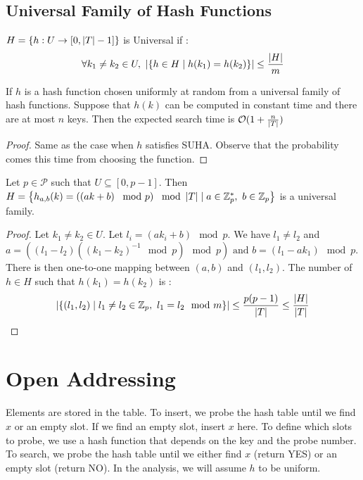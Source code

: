 \documentclass{cours}
\begin{document}
\subsection{Universal Family of Hash Functions}
$H = \left\{h : U \rightarrow \left[0, \left|T\right|-1\right]\right\}$ is Universal if :
\[
    \forall k_{1} \neq k_{2} \in U, \ \left|\left\{h \in H \mid h(k_{1}) = h(k_{2})\right\}\right| \leq \frac{\left|H\right|}{m}
\]
\begin{theorem}
    If $h$ is a hash function chosen uniformly at random from a universal family of hash functions. Suppose that $h(k)$ can be computed in constant time and there are at most $n$ keys. Then the expected search time is $\mathcal{O}(1 + \frac{n}{\left|T\right|})$
\end{theorem}
\begin{proof}
    Same as the case when $h$ satisfies SUHA. Observe that the probability comes this time from choosing the function. 
\end{proof}

\begin{theorem}
    Let $p \in \mathcal{P}$ such that $U \subseteq \left[0, p-1\right]$. Then $H = \left\{h_{a, b}(k) = \left(\left(ak + b\right) \mod p\right) \mod \abs{T} \mid a \in \Z_{p}^{*}, \ b \in \Z_{p} \right\}$ is a universal family.
\end{theorem}
\begin{proof}
    Let $k_{1} \neq k_{2} \in U$. Let $l_{i} = (ak_{i} + b) \mod p$. We have $l_{1} \neq l_{2}$ and $ a = ((l_{1} - l_{2})((k_{1}-k_{2})^{-1} \mod p) \mod p) \text{ and } b = (l_{1} - ak_{1}) \mod p$. There is then one-to-one mapping between $(a, b)$ and $(l_{1}, l_{2})$. The number of $h \in H$ such that $h(k_{1}) = h(k_{2})$ is :
    \[
        \left|\left\{(l_{1}, l_{2})\mid l_{1} \neq l_{2} \in \mathbb{Z}_{p}, \ l_{1} = l_{2} \mod m \right\}\right| \leq \frac{p(p-1)}{\left|T\right|} \leq \frac{\left|H\right|}{\left|T\right|}
    \]
\end{proof}


\section{Open Addressing}
Elements are stored in the table. To insert, we probe the hash table until we find $x$ or an empty slot. If we find an empty slot, insert $x$ here. To define which slots to probe, we use a hash function that depends on the key and the probe number. To search, we probe the hash table until we either find $x$ (return YES) or an empty slot (return NO). In the analysis, we will assume $h$ to be uniform. 
\end{document}

